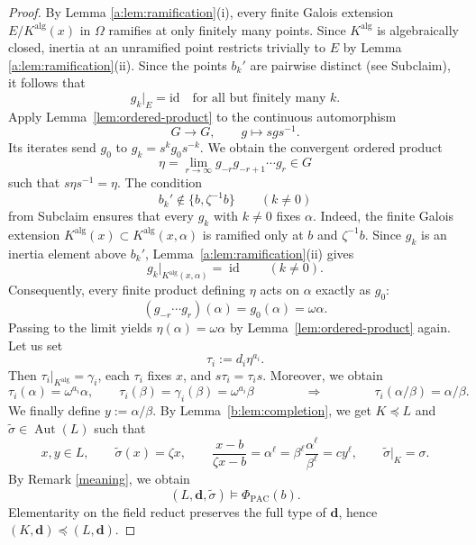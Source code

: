 \documentclass[10pt,a4paper]{amsart}
\theoremstyle{definition}
\newenvironment{claimproof}[1][Proof of Claim \theclaim.]
 {%
	\proof[#1]%
\renewcommand*\qedsymbol{$\square$\tiny{Claim \theclaim}}
}
{%
	\endproof%
}
\newcommand{\alg}{\mathrm{alg}}
\newcommand{\bd}{\boldsymbol d}
\DeclareMathOperator{\Aut}{Aut}
\DeclareMathOperator{\id}{id}
\begin{document}
\begin{proof}
\begin{claimproof}
\smallskip
By Lemma \ref{a:lem:ramification}(i), every finite Galois extension $E/K^\alg(x)$ in $\Omega$ ramifies at only
finitely many points. Since $K^\alg$ is algebraically closed, inertia at an
unramified point restricts trivially to $E$ by Lemma \ref{a:lem:ramification}(ii). Since the points $b_k'$ are pairwise distinct (see Subclaim), it follows that
\[
g_k|_E=\mathrm{id}\quad\text{for all but finitely many }k.
\]
Apply Lemma~\ref{lem:ordered-product} to the continuous
automorphism
\[
G\longrightarrow G,\qquad g\longmapsto sgs^{-1}.
\]
Its iterates send $g_0$ to $g_k=s^kg_0s^{-k}$.
We obtain the convergent ordered product
\[
\eta=\lim_{r\to\infty}g_{-r}g_{-r+1}\cdots g_r\in G
\]
such that $s\eta s^{-1}=\eta$. The condition
\[
b_k'\notin\{b,\zeta^{-1}b\}\qquad(k\ne0)
\]
from Subclaim ensures that every $g_k$ with $k\ne0$ fixes $\alpha$.
Indeed, the finite Galois extension
$K^{\alg}(x)\subset K^{\alg}(x,\alpha)$ is ramified only at $b$ and $\zeta^{-1}b$.
Since $g_k$ is an inertia element above $b_k'$,
Lemma~\ref{a:lem:ramification}(ii) gives
\[
g_k|_{K^{\alg}(x,\alpha)}=\id
\qquad(k\ne0).
\]
Consequently, every finite product defining $\eta$ acts on
$\alpha$ exactly as $g_0$:
\[
(g_{-r}\cdots g_r)(\alpha)=g_0(\alpha)=\omega\alpha.
\]
Passing to the limit yields $\eta(\alpha)=\omega\alpha$ by Lemma~\ref{lem:ordered-product} again.
\end{claimproof}
Let us set
\[
\tau_i:=d_i\eta^{a_i}.
\]
Then $\tau_i|_{K^{\alg}}=\gamma_i$, each $\tau_i$ fixes $x$, and
$s\tau_i=\tau_i s$. Moreover, we obtain
\[
\tau_i(\alpha)=\omega^{a_i}\alpha,\qquad
\tau_i(\beta)=\gamma_i(\beta)=\omega^{a_i}\beta\qquad \qquad \Longrightarrow\qquad \qquad
\tau_i(\alpha/\beta)=\alpha/\beta.
\]
We finally define $y:=\alpha/\beta$. By Lemma~\ref{b:lem:completion}, we get $K\preccurlyeq L$ and $\widetilde{\sigma}\in \Aut(L)$ such that
\[
x,y\in L,\qquad
\widetilde\sigma(x)=\zeta x,\qquad
\frac{x-b}{\zeta x-b}=\alpha ^\ell=\beta ^\ell\frac{\alpha ^\ell}{\beta ^\ell}=cy^\ell,\qquad \widetilde{\sigma}|_K=\sigma.
\]
By Remark \ref{meaning}, we obtain
\[
(L,\bd,\widetilde{\sigma})\models \Phi_{\mathrm{PAC}}(b).
\]
Elementarity on the
field reduct preserves the full type of $\bd$, hence $(K,\bd)\preccurlyeq(L,\bd)$.
\end{proof}
\end{document}
